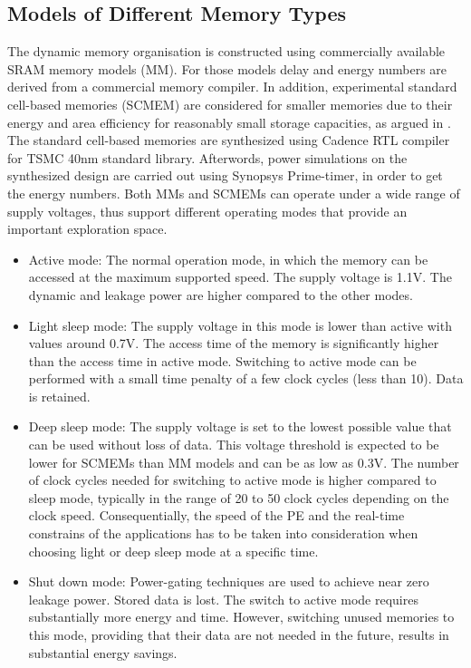 \documentclass[smallextended]{svjour3}
\begin{document}
\subsection{Models of Different Memory Types}
The dynamic memory organisation is constructed using commercially available SRAM memory models (MM).
For those models delay and energy numbers are derived from a commercial memory compiler.
In addition, experimental standard cell-based memories (SCMEM) \cite{Mei11}  are  considered for smaller memories due to their energy and area efficiency for reasonably small storage capacities, as argued in \cite{Mei10}. 
The standard cell-based memories are synthesized using Cadence RTL compiler for TSMC 40nm standard library. 
Afterwords, power simulations on the synthesized design are carried out using Synopsys Prime-timer, in order to get the energy numbers.
Both MMs and SCMEMs can operate under a wide range of supply voltages, thus support different operating modes that provide an important exploration space.
\begin{itemize}
\item Active mode: The normal operation mode, in which the memory can be accessed at the maximum supported speed. The supply voltage is 1.1V. 
The dynamic and leakage power are higher compared to the other modes.
\item Light sleep mode: The supply voltage in this mode is lower than active with values around 0.7V. 
The access time of the memory is significantly higher than the access time in active mode. 
Switching to active mode can be performed with a small time penalty of a few clock cycles (less than 10). 
Data is retained.  
\item Deep sleep mode: The supply voltage is set to the lowest possible value that can be used without loss of data. 
This voltage threshold is expected to be lower for SCMEMs than MM models and can be as low as 0.3V. 
The number of clock cycles needed for switching to active mode is higher compared to sleep mode, typically in the range of 20 to 50 clock cycles depending on the clock speed. 
Consequentially, the speed of the PE and the real-time constrains of the applications has to be taken into consideration when choosing light or deep sleep mode at a specific time.  
\item Shut down mode: Power-gating techniques are used to achieve near zero leakage power. 
Stored data is lost. 
The switch to active mode requires substantially more energy and time. 
However, switching unused memories to this mode, providing that their data are not needed in the future, results in substantial energy savings.
\end{itemize}  
\end{document}
